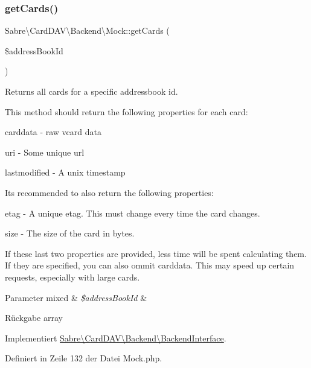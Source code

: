 \subsubsection{\texorpdfstring{get\+Cards()}{getCards()}}
{\footnotesize\ttfamily Sabre\textbackslash{}\+Card\+D\+A\+V\textbackslash{}\+Backend\textbackslash{}\+Mock\+::get\+Cards (\begin{DoxyParamCaption}\item[{}]{\$address\+Book\+Id }\end{DoxyParamCaption})}

Returns all cards for a specific addressbook id.

This method should return the following properties for each card\+:
\begin{DoxyItemize}
\item carddata -\/ raw vcard data
\item uri -\/ Some unique url
\item lastmodified -\/ A unix timestamp
\end{DoxyItemize}

It\textquotesingle{}s recommended to also return the following properties\+:
\begin{DoxyItemize}
\item etag -\/ A unique etag. This must change every time the card changes.
\item size -\/ The size of the card in bytes.
\end{DoxyItemize}

If these last two properties are provided, less time will be spent calculating them. If they are specified, you can also ommit carddata. This may speed up certain requests, especially with large cards.


\begin{DoxyParams}[1]{Parameter}
mixed & {\em \$address\+Book\+Id} & \\
\hline
\end{DoxyParams}
\begin{DoxyReturn}{Rückgabe}
array 
\end{DoxyReturn}


Implementiert \mbox{\hyperlink{interface_sabre_1_1_card_d_a_v_1_1_backend_1_1_backend_interface_aa616e3059b786eb7d97340f8527c4e3c}{Sabre\textbackslash{}\+Card\+D\+A\+V\textbackslash{}\+Backend\textbackslash{}\+Backend\+Interface}}.



Definiert in Zeile 132 der Datei Mock.\+php.

\mbox{\label{class_sabre_1_1_card_d_a_v_1_1_backend_1_1_mock_aa450469f499cdd00033137f6c9071ca1}} 
